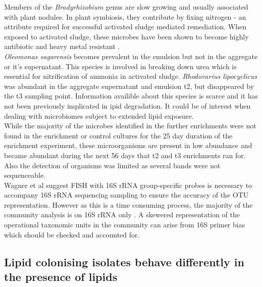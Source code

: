 \documentclass[11pt]{article}
\begin{document}
Members of the \emph{Bradyrhizobium} genus are slow growing \cite{rebah2002wastewater} and usually associated with plant nodules. In plant symbiosis, they contribute by fixing nitrogen - an attribute required for successful activated sludge mediated remediation. When exposed to activated sludge, these microbes have been shown to become highly antibiotic and heavy metal resistant \cite{ahmad17samiullah}.\\


\emph{Oleomonas sagarensis} becomes prevalent in the emulsion but not in the aggregate or it's supernatant. This species is involved in breaking down urea \cite{kanamori2005allophanate,kanamori2004enzymatic} which is essential for nitrification of ammonia in activated sludge.
\emph{Rhodovarius lipocyclicus} was abundant in the aggregate supernatant and emulsion t2, but disappeared by the t3 sampling point. Information availible about this species is scarce \cite{kampfer2004rhodovarius} and it has not been previously implicated in ipid degradation. It could be of interest when dealing with microbiomes subject to extended lipid exposure. \\

While the majority of the microbes identified in the further enrichments were not found in the enrichment or control cultures for the 25 day duration of the enrichment experiment, these microorganisms are present in low abundance and became abundant during the next 56 days that t2 and t3 enrichments ran for. Also the detection of organisms was limited as several bands were not sequenceable.\\




Wagner et al suggest FISH with 16S rRNA group-specific probes is necessary to accompany 16S rRNA sequencing sampling to ensure the accuracy of the OTU representation. However as this is a time consuming process, the majority of the community analysis is on 16S rRNA only \cite{Wagner_02} . A skewered representation of the operational taxonomic units in the community can arise from 16S primer bias which should be checked and accounted for.


\subsection{Lipid colonising isolates behave differently in the presence of lipids}
\end{document}
